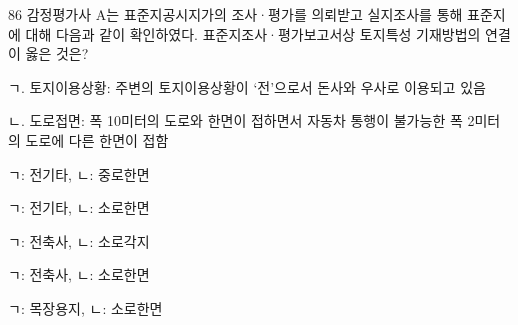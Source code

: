 \begin{question}{86}
감정평가사 A는 표준지공시지가의 조사·평가를 의뢰받고 실지조사를 통해 표준지에 대해 다음과 같이 확인하였다. 표준지조사·평가보고서상 토지특성 기재방법의 연결이 옳은 것은?
\begin{framedtext}
ㄱ. 토지이용상황: 주변의 토지이용상황이 ‘전’으로서 돈사와 우사로 이용되고 있음 \par
ㄴ. 도로접면: 폭 10미터의 도로와 한면이 접하면서 자동차 통행이 불가능한 폭 2미터의 도로에 다른 한면이 접함 \par
\end{framedtext}
\begin{choices}
  \item ㄱ: 전기타, \quad ㄴ: 중로한면
  \item ㄱ: 전기타, \quad ㄴ: 소로한면
  \item ㄱ: 전축사, \quad ㄴ: 소로각지
  \item ㄱ: 전축사, \quad ㄴ: 소로한면
  \item ㄱ: 목장용지, \quad ㄴ: 소로한면
\end{choices}
\end{question}

